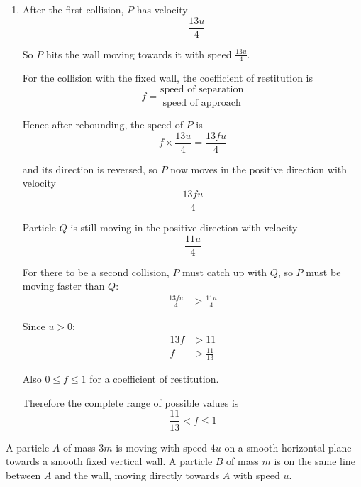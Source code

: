 \documentclass[leqno]{article}
\begin{document}
\begin{enumerate}[
  label=\textbf{\arabic*.},
  leftmargin=*,
  topsep=0pt,
  partopsep=0pt,
  parsep=0pt
]
\begin{djsSolution}
\begin{enumerate}[label=\textbf{(\alph*)}]
  So the kinetic energy lost is
  \begin{align*}
  44mu^2-\frac{127}{4}mu^2
  &=\frac{176}{4}mu^2-\frac{127}{4}mu^2 \\
  &=\frac{49}{4}mu^2
  \end{align*}


  \item After the first collision, $P$ has velocity
  \[
  -\frac{13u}{4}
  \]

  So $P$ hits the wall moving towards it with speed $\frac{13u}{4}$.

  For the collision with the fixed wall, the coefficient of restitution is
  \[
  f=\frac{\text{speed of separation}}{\text{speed of approach}}
  \]

  Hence after rebounding, the speed of $P$ is
  \[
  f\times \frac{13u}{4}=\frac{13fu}{4}
  \]

  and its direction is reversed, so $P$ now moves in the positive direction with velocity
  \[
  \frac{13fu}{4}
  \]

  Particle $Q$ is still moving in the positive direction with velocity
  \[
  \frac{11u}{4}
  \]

  For there to be a second collision, $P$ must catch up with $Q$, so $P$ must be moving faster than $Q$:
  \begin{align*}
  \frac{13fu}{4}&>\frac{11u}{4}
  \end{align*}

  Since $u>0$:
  \begin{align*}
  13f&>11 \\
  f&>\frac{11}{13}
  \end{align*}

  Also $0\leq f\leq 1$ for a coefficient of restitution.

  Therefore the complete range of possible values is
  \[
  \frac{11}{13}<f\leq 1
  \]
\end{enumerate}
\end{djsSolution}


\newpage

\questionitem

A particle $A$ of mass $3m$ is moving with speed $4u$ on a smooth horizontal plane towards a smooth fixed vertical wall. A particle $B$ of mass $m$ is on the same line between $A$ and the wall, moving directly towards $A$ with speed $u$. \\


\end{enumerate}
\end{document}
